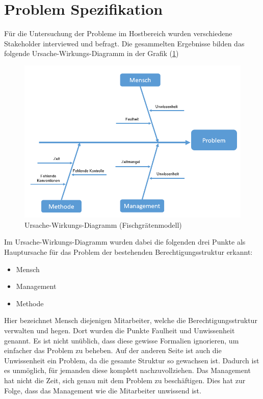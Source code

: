\section{Problem Spezifikation}
\label{sec:intro:UWD}
Für die Untersuchung der Probleme im Hostbereich wurden verschiedene Stakeholder interviewed und befragt.
Die gesammelten Ergebnisse bilden das folgende Ursache-Wirkungs-Diagramm in der Grafik (\ref{fig:Fisch})
\begin{figure}[h!]
 \centering
 \includegraphics[width=1\textwidth]{gfx/Picture/Fisch.PNG}
 \caption{Ursache-Wirkungs-Diagramm (Fischgrätenmodell)}
 \label{fig:Fisch}
\end{figure}
Im Ursache-Wirkungs-Diagramm wurden dabei die folgenden drei Punkte als Hauptursache für das Problem der bestehenden Berechtigungsstruktur erkannt:
\begin{itemize}
	\item Mensch
	\item Management
	\item Methode
\end{itemize}
Hier bezeichnet Mensch diejenigen Mitarbeiter, welche die Berechtigungsstruktur verwalten und hegen.
Dort wurden die Punkte Faulheit und Unwissenheit genannt.
Es ist nicht unüblich, dass diese gewisse Formalien ignorieren, um einfacher das Problem zu beheben.
Auf der anderen Seite ist auch die Unwissenheit ein Problem, da die gesamte Struktur so gewachsen ist.
Dadurch ist es unmöglich, für jemanden diese komplett nachzuvollziehen.
\newline
Das Management hat nicht die Zeit, sich genau mit dem Problem zu beschäftigen.
Dies hat zur Folge, dass das Management wie die Mitarbeiter unwissend ist.
